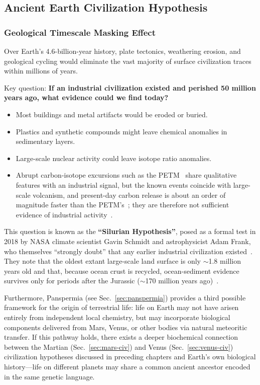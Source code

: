 \documentclass[aps,prd,twocolumn,superscriptaddress,nofootinbib]{revtex4-2}
\begin{document}
\subsection{Ancient Earth Civilization Hypothesis}\label{sec:earth-civ}

\subsubsection{Geological Timescale Masking Effect}\label{sec:geo-masking}

Over Earth's 4.6-billion-year history, plate tectonics, weathering erosion, and geological cycling would eliminate the vast majority of surface civilization traces within millions of years.

Key question: \textbf{If an industrial civilization existed and perished 50 million years ago, what evidence could we find today?}

\begin{itemize}
  \item Most buildings and metal artifacts would be eroded or buried.
  \item Plastics and synthetic compounds might leave chemical anomalies in sedimentary layers.
  \item Large-scale nuclear activity could leave isotope ratio anomalies.
  \item Abrupt carbon-isotope excursions such as the PETM~\cite{Kennett1991} share qualitative features with an industrial signal, but the known events coincide with large-scale volcanism, and present-day carbon release is about an order of magnitude faster than the PETM's~\cite{Zeebe2016}; they are therefore not sufficient evidence of industrial activity~\cite{Schmidt2019}.
\end{itemize}

This question is known as the \textbf{``Silurian Hypothesis''}, posed as a formal test in 2018 by NASA climate scientist Gavin Schmidt and astrophysicist Adam Frank, who themselves ``strongly doubt'' that any earlier industrial civilization existed~\cite{Schmidt2019}. They note that the oldest extant large-scale land surface is only ${\sim}$1.8 million years old and that, because ocean crust is recycled, ocean-sediment evidence survives only for periods after the Jurassic (${\sim}$170 million years ago)~\cite{Schmidt2019}.

Furthermore, Panspermia (see Sec.~\ref{sec:panspermia}) provides a third possible framework for the origin of terrestrial life: life on Earth may not have arisen entirely from independent local chemistry, but may incorporate biological components delivered from Mars, Venus, or other bodies via natural meteoritic transfer. If this pathway holds, there exists a deeper biochemical connection between the Martian (Sec.~\ref{sec:mars-civ}) and Venus (Sec.~\ref{sec:venus-civ}) civilization hypotheses discussed in preceding chapters and Earth's own biological history---life on different planets may share a common ancient ancestor encoded in the same genetic language.
\end{document}
